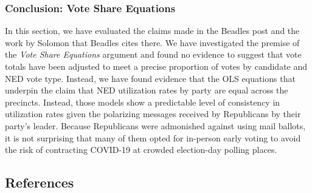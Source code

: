 \documentclass[12pt]{article}
\begin{document}
\subsubsection{Conclusion: Vote Share Equations}\label{conclusion-vote-share-equations}

In this section, we have evaluated the claims made in the Beadles post and the work by Solomon that Beadles cites there. We have investigated the premise of the \emph{Vote Share Equations} argument and found no evidence to suggest that vote totals have been adjusted to meet a precise proportion of votes by candidate and NED vote type. Instead, we have found evidence that the OLS equations that underpin the claim that NED utilization rates by party are equal across the precincts. Instead, those models show a predictable level of consistency in utilization rates given the polarizing messages received by Republicans by their party's leader. Because Republicans were admonished against using mail ballots, it is not surprising that many of them opted for in-person early voting to avoid the risk of contracting COVID-19 at crowded election-day polling places.

\newpage

\subsection*{References}\label{references}
\end{document}
